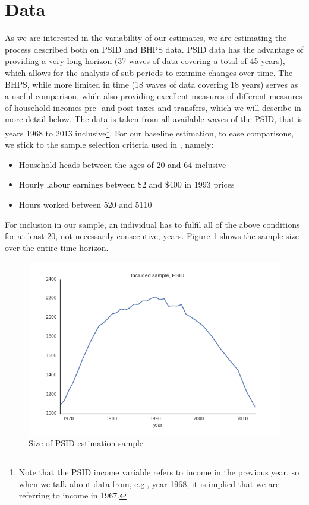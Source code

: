 \section{Data}
As we are interested in the variability of our estimates, we are estimating the
process described both on PSID and BHPS data. PSID data has the advantage of
providing a very long horizon (37 waves of data covering a total of 45 years),
which allows for the analysis of sub-periods to examine changes over time. The
BHPS, while more limited in time (18 waves of data covering 18 years) serves as
a useful comparison, while also providing excellent measures of different
measures of household incomes pre- and post taxes and transfers, which we will
describe in more detail below. 
The data is taken from all available waves of the PSID, that is years 1968 to
2013 inclusive\footnote{Note that the PSID income variable refers to income in
the previous year, so when we talk about data from, e.g., year 1968, it is
implied that we are referring to income in 1967.}. For our baseline estimation,
to ease comparisons, we stick to the sample selection criteria used in
\citet{Guvenen2009}, namely:
\begin{itemize}
	\item Household heads between the ages of 20 and 64 inclusive
    \item Hourly labour earnings between \$2 and \$400 in 1993 prices
    \item Hours worked between 520 and 5110
\end{itemize}
For inclusion in our sample, an individual has to fulfil all of the above
conditions for at least 20, not necessarily consecutive, years. Figure 
\ref{fig:psid_sample} shows the sample size over the entire time horizon.


\begin{figure}
\includegraphics[width=\columnwidth]{PSID_sample}
\caption{Size of PSID estimation sample}
\label{fig:psid_sample}
\end{figure}


